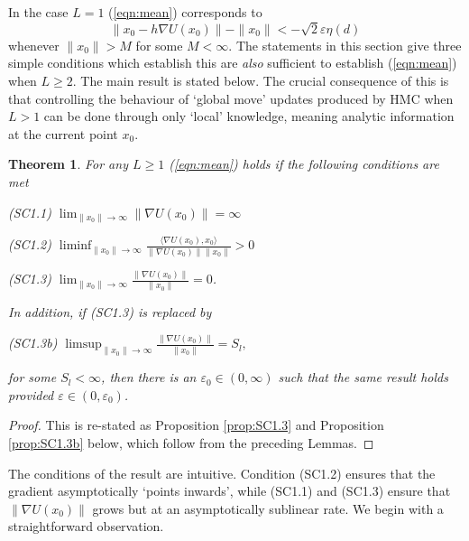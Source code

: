 \documentclass[bj,numbers,noshowframe]{imsart}
\newcommand{\e}{\varepsilon}
\theoremstyle{definition}
\theoremstyle{plain}
\newtheorem{thm}[defn]{Theorem}
\theoremstyle{definition}
\begin{document}
In the case $L=1$ (\ref{eqn:mean}) corresponds to
\begin{equation} \label{eqn:mean1step}
\|x_{0}-h\nabla U(x_{0})\|-\|x_{0}\|< -\sqrt{2}\e\eta(d)
\end{equation}
whenever $\|x_{0}\|>M$ for some $M<\infty$.  The statements in this section give three simple conditions which establish this are \emph{also} sufficient to establish (\ref{eqn:mean}) when $L\geq2$. The main result is stated below.
The crucial consequence of this is that controlling the behaviour
of `global move' updates produced by HMC when $L>1$ can be done through
only `local' knowledge, meaning analytic information at the current
point $x_{0}$.
\begin{thm}
For any $L\geq1$ (\ref{eqn:mean}) holds if the following conditions are met
\vspace{0.3cm}

(SC1.1) $\lim_{\|x_{0}\|\to\infty}\|\nabla U(x_{0})\|=\infty$
\vspace{0.3cm}

(SC1.2) $\liminf_{\|x_{0}\|\to\infty}\frac{\langle\nabla U(x_{0}),x_{0}\rangle}{\|\nabla U(x_0)\|\|x_{0}\|} >0$
\vspace{0.3cm}

(SC1.3) $\lim_{\|x_{0}\|\to\infty}\frac{\|\nabla U(x_{0})\|}{\|x_{0}\|}=0$.
\vspace{0.3cm}

\noindent In addition, if (SC1.3) is replaced by
\vspace{0.3cm}

(SC1.3b) $\limsup_{\|x_{0}\|\to\infty}\frac{\|\nabla U(x_{0})\|}{\|x_{0}\|}=S_{l},$
\vspace{0.3cm}

\noindent for some $S_{l}<\infty$, then there is an $\e_{0}\in(0,\infty)$
such that the same result holds provided $\e\in(0,\e_{0})$.
\end{thm}
\begin{proof}
This is re-stated as Proposition \ref{prop:SC1.3} and Proposition
\ref{prop:SC1.3b} below, which follow from the preceding Lemmas.
\end{proof}
The conditions of the result are intuitive. Condition (SC1.2) ensures
that the gradient asymptotically `points inwards', while (SC1.1) and (SC1.3) ensure that  $\|\nabla U(x_{0})\|$ grows but at an asymptotically sublinear rate. We begin with a straightforward observation.
\end{document}
